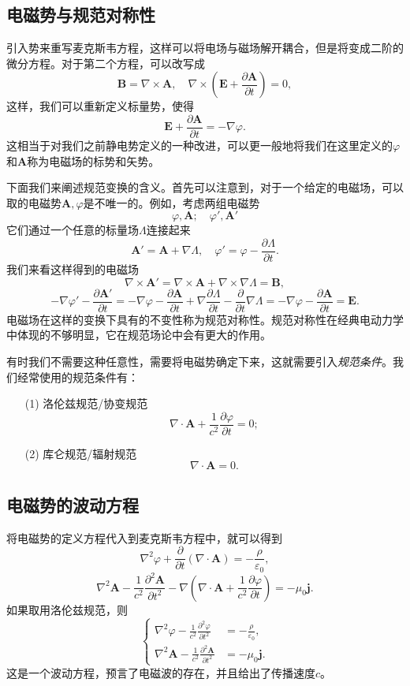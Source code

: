 \documentclass[UTF8]{ctexbook}
\renewcommand{\b}{\boldsymbol}
\numberwithin{equation}{chapter}
\begin{document}
	\subsection{电磁势与规范对称性}
	引入势来重写麦克斯韦方程，这样可以将电场与磁场解开耦合，但是将变成二阶的微分方程。对于第二个方程，可以改写成
	\[\b{B}=\nabla\times\b{A},\quad \nabla\times\left(\b{E}+\frac{\partial \b{A}}{\partial t}\right)=0,\]
	这样，我们可以重新定义标量势，使得
	\[\b{E}+\frac{\partial \b{A}}{\partial t}=-\nabla \varphi.\]
	这相当于对我们之前静电势定义的一种改进，可以更一般地将我们在这里定义的$\varphi$和$\b{A}$称为电磁场的标势和矢势。
	
	下面我们来阐述规范变换的含义。首先可以注意到，对于一个给定的电磁场，可以取的电磁势$\b{A},\varphi$是不唯一的。例如，考虑两组电磁势
	\[\varphi,\b{A};\quad \varphi',\b{A}'\]
	它们通过一个任意的标量场$\Lambda$连接起来
	\[\b{A}'=\b{A}+\nabla\Lambda,\quad \varphi'=\varphi-\frac{\partial \Lambda}{\partial t}.\]
	我们来看这样得到的电磁场
	\[\nabla\times\b{A}'=\nabla\times\b{A}+\nabla\times\nabla\Lambda=\b{B},\]
	\[-\nabla\varphi'-\frac{\partial \b{A}'}{\partial t}=-\nabla\varphi-\frac{\partial \b{A}}{\partial t}+\nabla\frac{\partial \Lambda}{\partial t}-\frac{\partial }{\partial t}\nabla\Lambda=-\nabla\varphi-\frac{\partial \b{A}}{\partial t}=\b{E}.\]
	电磁场在这样的变换下具有的不变性称为规范对称性。规范对称性在经典电动力学中体现的不够明显，它在规范场论中会有更大的作用。
	
	有时我们不需要这种任意性，需要将电磁势确定下来，这就需要引入\emph{规范条件}。我们经常使用的规范条件有：
	\begin{itemize}
		\item[(1)]洛伦兹规范/协变规范
		\[\nabla\cdot\b{A}+\frac{1}{c^2}\frac{\partial \varphi}{\partial t}=0;\]
		\item[(2)]库仑规范/辐射规范
		\[\nabla\cdot\b{A}=0.\]
	\end{itemize}
	
	\subsection{电磁势的波动方程}
	将电磁势的定义方程代入到麦克斯韦方程中，就可以得到
	\[\nabla^2\varphi+\frac{\partial }{\partial t}(\nabla\cdot\b{A})=-\frac{\rho}{\varepsilon_0},\]
	\[\nabla^2\b{A}-\frac{1}{c^2}\frac{\partial^2\b{A}}{\partial t^2}-\nabla\left(\nabla\cdot\b{A}+\frac{1}{c^2}\frac{\partial\varphi}{\partial t}\right)=-\mu_0\b{j}.\]
	如果取用洛伦兹规范，则
	\[\left\{\begin{aligned}
		\nabla^2\varphi-\frac{1}{c^2}\frac{\partial ^2\varphi}{\partial t^2}&=-\frac{\rho}{\varepsilon_0}, \\
		\nabla^2\b{A}-\frac{1}{c^2}\frac{\partial^2\b{A}}{\partial t^2}&=-\mu_0\b{j}.
	\end{aligned}\right.\]
	这是一个波动方程，预言了电磁波的存在，并且给出了传播速度$c$。
	
\end{document}
